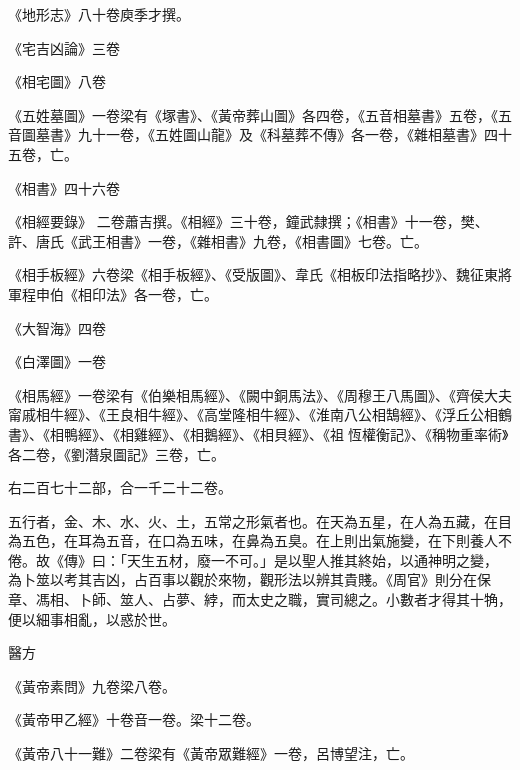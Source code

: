 \begin{pinyinscope}
 《地形志》八十卷庾季才撰。



 《宅吉凶論》三卷



 《相宅圖》八卷



 《五姓墓圖》一卷梁有《塚書》、《黃帝葬山圖》各四卷，《五音相墓書》五卷，《五音圖墓書》九十一卷，《五姓圖山龍》及《科墓葬不傳》各一卷，《雜相墓書》四十五卷，亡。



 《相書》四十六卷



 《相經要錄》
 二卷蕭吉撰。《相經》三十卷，鐘武隸撰；《相書》十一卷，樊、許、唐氏《武王相書》一卷，《雜相書》九卷，《相書圖》七卷。亡。



 《相手板經》六卷梁《相手板經》、《受版圖》、韋氏《相板印法指略抄》、魏征東將軍程申伯《相印法》各一卷，亡。



 《大智海》四卷



 《白澤圖》一卷



 《相馬經》一卷梁有《伯樂相馬經》、《闕中銅馬法》、《周穆王八馬圖》、《齊侯大夫甯戚相牛經》、《王良相牛經》、《高堂隆相牛經》、《淮南八公相鵠經》、《浮丘公相鶴書》、《相鴨經》、《相雞經》、《相鵝經》、《相貝經》、《祖恆權衡記》、《稱物重率術》各二卷，《劉潛泉圖記》三卷，亡。



 右二百七十二部，合一千二十二卷。



 五行者，金、木、水、火、土，五常之形氣者也。在天為五星，在人為五藏，在目為五色，在耳為五音，在口為五味，在鼻為五臭。在上則出氣施變，在下則養人不倦。故《傳》曰：「天生五材，廢一不可。」是以聖人推其終始，以通神明之變，
 為卜筮以考其吉凶，占百事以觀於來物，觀形法以辨其貴賤。《周官》則分在保章、馮相、卜師、筮人、占夢、綍，而太史之職，實司總之。小數者才得其十觕，便以細事相亂，以惑於世。



 醫方



 《黃帝素問》九卷梁八卷。



 《黃帝甲乙經》十卷音一卷。梁十二卷。



 《黃帝八十一難》二卷梁有《黃帝眾難經》一卷，呂博望注，亡。




\end{pinyinscope}
